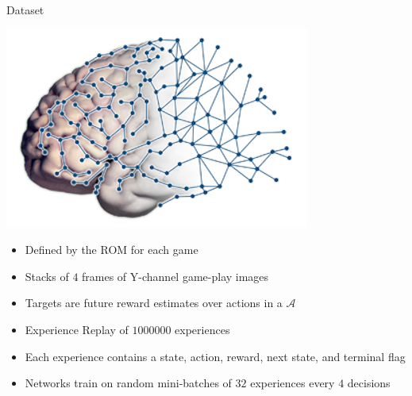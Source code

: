 \documentclass{beamer}
\begin{document}
\begin{frame}{Dataset}
\begin{minipage}{\textwidth}
%
\begin{minipage}{0.35\textwidth}
\centering
\includegraphics[width=\textwidth]{img/brain}
\end{minipage}
%
\hfill
%
\begin{minipage}{0.6\textwidth}
\begin{itemize}
    \item{Defined by the ROM for each game}
    \item{Stacks of $4$ frames of Y-channel game-play images}
    \item{Targets are future reward estimates over actions in a $\mathcal{A}$}
    \item{Experience Replay of $1000000$ experiences}
    \item{Each experience contains a state, action, reward, next state, and terminal flag}
    \item{Networks train on random mini-batches of $32$ experiences every $4$ decisions}
\end{itemize}
\end{minipage}
%
\end{minipage}
\end{frame}
\end{document}
